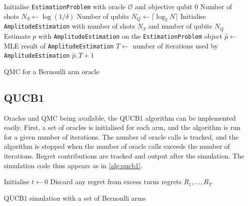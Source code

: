 \begin{algorithm}
    \SetAlgoLined
    Initialise \texttt{EstimationProblem} with oracle $\mathcal{O}$ and objective qubit 0 \;
    Number of shots $N_S \leftarrow \log(1 / \delta)$ \;
    Number of qubits $N_Q \leftarrow \lceil \log_2 N \rceil$ \;
    Initialise \texttt{AmplitudeEstimation} with number of shots $N_S$ and number of qubits $N_Q$ \;
    Estimate $p$ with \texttt{AmplitudeEstimation} on the \texttt{EstimationProblem} object \;
    $\hat{p} \leftarrow$ MLE result of \texttt{AmplitudeEstimation} \;
    $T \leftarrow$ number of iterations used by \texttt{AmplitudeEstimation} \;
    \Return $\hat{p}, T + 1$
    \caption{QMC for a Bernoulli arm oracle}
    \label{alg:qucb_qmc}
\end{algorithm}

\subsection{QUCB1}
Oracles and QMC being available, the QUCB1 algorithm can be implemented easily.
First, a set of oracles is initialised for each arm, and the algorithm is run for a given number of iterations.
The number of oracle calls is tracked, and the algorithm is stopped when the number of oracle calls exceeds the number of iterations.
Regret contributions are tracked and output after the simulation.
The simulation code thus appears as in \cref{alg:qucb1}.

\begin{algorithm}
    \SetAlgoLined
    Initialise $t \leftarrow 0$ \;
    Discard any regret from excess turns \;
    \Return regrets $R_1, \ldots, R_T$
    \caption{QUCB1 simulation with a set of Bernoulli arms}
    \label{alg:qucb1_sim}
\end{algorithm}
